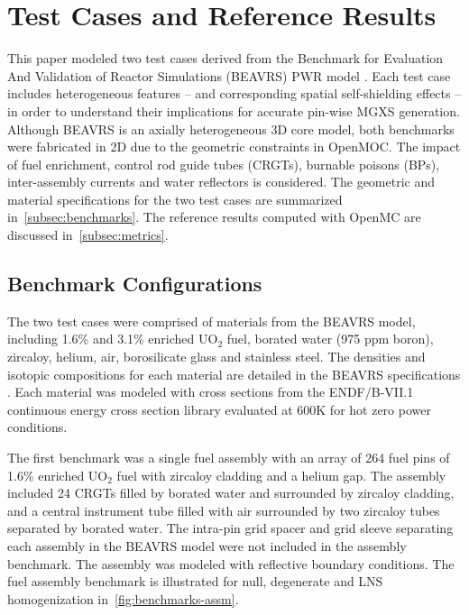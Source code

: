 \section{Test Cases and Reference Results}
\label{sec:test-cases}

This paper modeled two test cases derived from the Benchmark for Evaluation And Validation of Reactor Simulations (BEAVRS) PWR model \citep{horelik2013beavrs}. Each test case includes heterogeneous features -- and corresponding spatial self-shielding effects -- in order to understand their implications for accurate pin-wise MGXS generation. Although BEAVRS is an axially heterogeneous 3D core model, both benchmarks were fabricated in 2D due to the geometric constraints in OpenMOC. The impact of fuel enrichment, control rod guide tubes (CRGTs), burnable poisons (BPs), inter-assembly currents and water reflectors is considered. The geometric and material specifications for the two test cases are summarized in~\autoref{subsec:benchmarks}. The reference results computed with OpenMC are discussed in~\autoref{subsec:metrics}.


\subsection{Benchmark Configurations}
\label{subsec:benchmarks}

The two test cases were comprised of materials from the BEAVRS model, including 1.6\% and 3.1\% enriched UO$_2$ fuel, borated water (975 ppm boron), zircaloy, helium, air, borosilicate glass and stainless steel. The densities and isotopic compositions for each material are detailed in the BEAVRS specifications \citep{horelik2013beavrs}. Each material was modeled with cross sections from the ENDF/B-VII.1 continuous energy cross section library \citep{mcnpx2003manual} evaluated at 600K for hot zero power conditions.

The first benchmark was a single fuel assembly with an array of 264 fuel pins of 1.6\% enriched UO$_2$ fuel with zircaloy cladding and a helium gap. The assembly included 24 CRGTs filled by borated water and surrounded by zircaloy cladding, and a central instrument tube filled with air surrounded by two zircaloy tubes separated by borated water. The intra-pin grid spacer and grid sleeve separating each assembly in the BEAVRS model were not included in the assembly benchmark. The assembly was modeled with reflective boundary conditions. The fuel assembly benchmark is illustrated for null, degenerate and LNS homogenization in~\autoref{fig:benchmarks-assm}.

